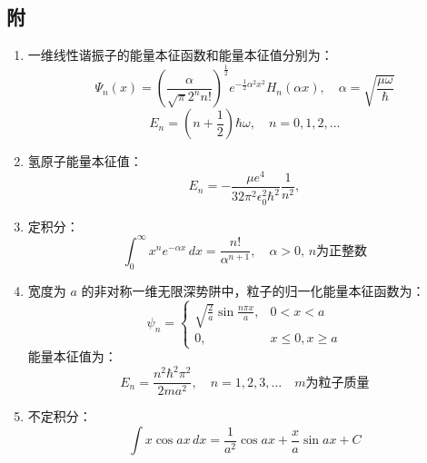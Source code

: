 \subsection{附}
\begin{enumerate}
    \item 一维线性谐振子的能量本征函数和能量本征值分别为：
    \[
    \Psi_n(x) = \left(\frac{\alpha}{\sqrt{\pi} 2^n n!}\right)^\frac{1}{2} e^{-\frac{1}{2} \alpha^2 x^2} H_n(\alpha x), \quad \alpha = \sqrt{\frac{\mu\omega}{\hbar}}~
    \]
    \[
    E_n = \left(n + \frac{1}{2}\right) \hbar \omega, \quad n = 0,1,2,\dots~
    \]
    
    \item 氢原子能量本征值：
    \[
    E_n = -\frac{\mu e^4}{32 \pi^2 \epsilon_0^2 \hbar^2} \frac{1}{n^2},~
    \]
    
    \item 定积分：
    \[
    \int_0^{\infty} x^n e^{-\alpha x} \, dx = \frac{n!}{\alpha^{n+1}}, \quad \alpha > 0, \, n \text{为正整数}~
    \]
    
    \item 宽度为 $a$ 的非对称一维无限深势阱中，粒子的归一化能量本征函数为：
    \[
    \psi_n = 
    \begin{cases} 
    \sqrt{\frac{2}{a}} \sin \frac{n\pi x}{a}, & 0 < x < a \\
    0, & x \leq 0 , x \geq a
    \end{cases}~
    \]
    能量本征值为：
    \[
    E_n = \frac{n^2 \hbar^2 \pi^2}{2ma^2}, \quad n = 1,2,3,\dots \quad m \text{为粒子质量}~
    \]
    
    \item 不定积分：
    \[
    \int x \cos ax \, dx = \frac{1}{a^2} \cos ax + \frac{x}{a} \sin ax + C~
    \]
    
\end{enumerate}